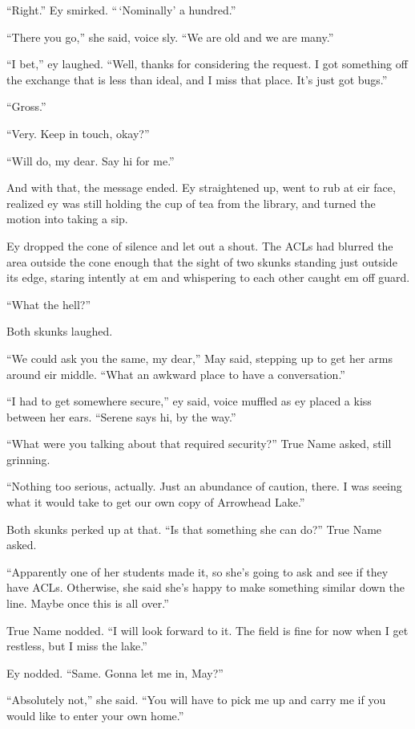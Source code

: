 ``Right.'' Ey smirked. ``\,`Nominally' a hundred.''

``There you go,'' she said, voice sly. ``We are old and we are many.''

``I bet,'' ey laughed. ``Well, thanks for considering the request. I got something off the exchange that is less than ideal, and I miss that place. It's just got bugs.''

``Gross.''

``Very. Keep in touch, okay?''

``Will do, my dear. Say hi for me.''

And with that, the message ended. Ey straightened up, went to rub at eir face, realized ey was still holding the cup of tea from the library, and turned the motion into taking a sip.

Ey dropped the cone of silence and let out a shout. The ACLs had blurred the area outside the cone enough that the sight of two skunks standing just outside its edge, staring intently at em and whispering to each other caught em off guard.

``What the hell?''

Both skunks laughed.

``We could ask you the same, my dear,'' May said, stepping up to get her arms around eir middle. ``What an awkward place to have a conversation.''

``I had to get somewhere secure,'' ey said, voice muffled as ey placed a kiss between her ears. ``Serene says hi, by the way.''

``What were you talking about that required security?'' True Name asked, still grinning.

``Nothing too serious, actually. Just an abundance of caution, there. I was seeing what it would take to get our own copy of Arrowhead Lake.''

Both skunks perked up at that. ``Is that something she can do?'' True Name asked.

``Apparently one of her students made it, so she's going to ask and see if they have ACLs. Otherwise, she said she's happy to make something similar down the line. Maybe once this is all over.''

True Name nodded. ``I will look forward to it. The field is fine for now when I get restless, but I miss the lake.''

Ey nodded. ``Same. Gonna let me in, May?''

``Absolutely not,'' she said. ``You will have to pick me up and carry me if you would like to enter your own home.''

